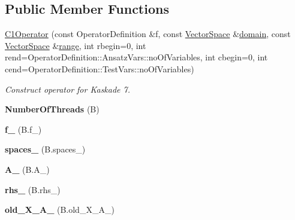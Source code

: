 \subsection*{Public Member Functions}
\begin{DoxyCompactItemize}
\item 
\hyperlink{classSpacy_1_1Kaskade_1_1C1Operator_aa31e9f54fcbb4eb6c40c1cd467d25836}{C1\-Operator} (const Operator\-Definition \&f, const \hyperlink{classSpacy_1_1VectorSpace}{Vector\-Space} \&\hyperlink{classSpacy_1_1OperatorBase_a2588f9b3e0188820c4c494e63293dc6f}{domain}, const \hyperlink{classSpacy_1_1VectorSpace}{Vector\-Space} \&\hyperlink{classSpacy_1_1OperatorBase_ab19d3b7a6f290b1079248f1e567e53d6}{range}, int rbegin=0, int rend=Operator\-Definition\-::\-Ansatz\-Vars\-::no\-Of\-Variables, int cbegin=0, int cend=Operator\-Definition\-::\-Test\-Vars\-::no\-Of\-Variables)
\begin{DoxyCompactList}\small\item\em Construct operator for Kaskade 7. \end{DoxyCompactList}\item 
\hypertarget{classSpacy_1_1Kaskade_1_1C1Operator_ae3e41254f9aa1362559472ec8335c630}{{\bfseries Number\-Of\-Threads} (B)}\label{classSpacy_1_1Kaskade_1_1C1Operator_ae3e41254f9aa1362559472ec8335c630}

\item 
\hypertarget{classSpacy_1_1Kaskade_1_1C1Operator_ad00c8f06ca3fa6a5b9a3bef10d05cb5e}{{\bfseries f\-\_\-} (B.\-f\-\_\-)}\label{classSpacy_1_1Kaskade_1_1C1Operator_ad00c8f06ca3fa6a5b9a3bef10d05cb5e}

\item 
\hypertarget{classSpacy_1_1Kaskade_1_1C1Operator_a385533b1eff2a7d87962249587d07db9}{{\bfseries spaces\-\_\-} (B.\-spaces\-\_\-)}\label{classSpacy_1_1Kaskade_1_1C1Operator_a385533b1eff2a7d87962249587d07db9}

\item 
\hypertarget{classSpacy_1_1Kaskade_1_1C1Operator_a17ca470a8d5dc19211e290a924ce2750}{{\bfseries A\-\_\-} (B.\-A\-\_\-)}\label{classSpacy_1_1Kaskade_1_1C1Operator_a17ca470a8d5dc19211e290a924ce2750}

\item 
\hypertarget{classSpacy_1_1Kaskade_1_1C1Operator_a60e772d90f9a1546aa9d196fa93459d6}{{\bfseries rhs\-\_\-} (B.\-rhs\-\_\-)}\label{classSpacy_1_1Kaskade_1_1C1Operator_a60e772d90f9a1546aa9d196fa93459d6}

\item 
\hypertarget{classSpacy_1_1Kaskade_1_1C1Operator_ab5f1bb2cf0f05f6102520fba0798c985}{{\bfseries old\-\_\-\-X\-\_\-\-A\-\_\-} (B.\-old\-\_\-\-X\-\_\-\-A\-\_\-)}\label{classSpacy_1_1Kaskade_1_1C1Operator_ab5f1bb2cf0f05f6102520fba0798c985}


\end{DoxyCompactItemize}
